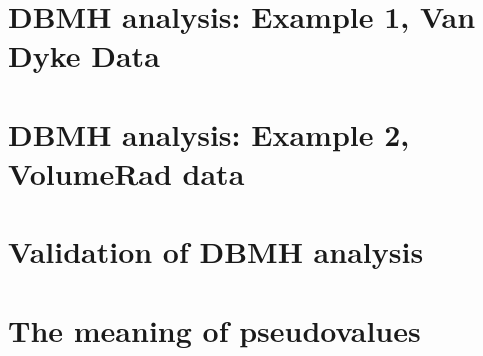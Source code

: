 \documentclass[
]{book}
\newenvironment{Shaded}{\begin{snugshade}}{\end{snugshade}}
\newcommand{\CommentTok}[1]{\textcolor[rgb]{0.56,0.35,0.01}{\textit{#1}}}
\newcommand{\DecValTok}[1]{\textcolor[rgb]{0.00,0.00,0.81}{#1}}
\newcommand{\KeywordTok}[1]{\textcolor[rgb]{0.13,0.29,0.53}{\textbf{#1}}}
\newcommand{\NormalTok}[1]{#1}
\newcommand{\OperatorTok}[1]{\textcolor[rgb]{0.81,0.36,0.00}{\textbf{#1}}}
\newcommand{\StringTok}[1]{\textcolor[rgb]{0.31,0.60,0.02}{#1}}
\begin{document}
\begin{Shaded}
\end{Shaded}

\hypertarget{dbmh-analysis-example-1-van-dyke-data}{%
\section{DBMH analysis: Example 1, Van Dyke Data}\label{dbmh-analysis-example-1-van-dyke-data}}

\hypertarget{dbmh-analysis-example-2-volumerad-data}{%
\section{DBMH analysis: Example 2, VolumeRad data}\label{dbmh-analysis-example-2-volumerad-data}}

\hypertarget{validation-of-dbmh-analysis}{%
\section{Validation of DBMH analysis}\label{validation-of-dbmh-analysis}}

\hypertarget{the-meaning-of-pseudovalues}{%
\section{The meaning of pseudovalues}\label{the-meaning-of-pseudovalues}}
\end{document}
